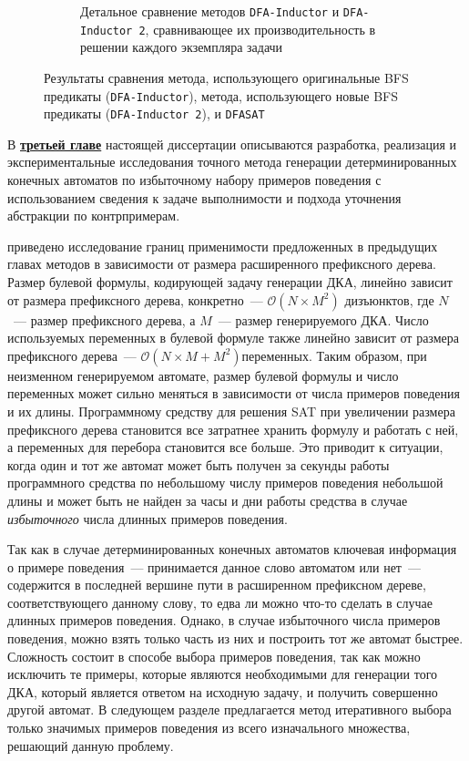 \begin{figure}[ht]
\begin{subfigure}[b]{0.48\textwidth}
    \caption{Детальное сравнение методов \texttt{DFA-Inductor} и \texttt{DFA-Inductor~2}, сравнивающее их производительность в решении каждого экземпляра задачи}
    \label{syn:img:plots:scatter}
  \end{subfigure}
  \caption{Результаты сравнения метода, использующего оригинальные BFS предикаты (\texttt{DFA-Inductor}), метода, использующего новые BFS предикаты (\texttt{DFA-Inductor~2}), и \texttt{DFASAT}}
  \label{syn:img:plots}
\end{figure}


В \textbf{\underline{третьей главе}} настоящей диссертации описываются разработка, реализация и экспериментальные исследования точного метода генерации детерминированных конечных автоматов по избыточному набору примеров поведения с использованием сведения к задаче выполнимости и подхода уточнения абстракции по контрпримерам.

\insection{\ref{sec:cegar:motivation}} приведено исследование границ применимости предложенных в предыдущих главах методов в зависимости от размера расширенного префиксного дерева. 
Размер булевой формулы, кодирующей задачу генерации ДКА, линейно зависит от размера префиксного дерева, конкретно~--- $\mathcal{O}\left(N \times M^{2}\right)$ дизъюнктов, где $N$~--- размер префиксного дерева, а $M$~--- размер генерируемого ДКА.
Число используемых переменных в булевой формуле также линейно зависит от размера префиксного дерева~--- $\mathcal{O}\left(N \times M + M^{2}\right) переменных.$
Таким образом, при неизменном генерируемом автомате, размер булевой формулы и число переменных может сильно меняться в зависимости от числа примеров поведения и их длины.
Программному средству для решения SAT при увеличении размера префиксного дерева становится все затратнее хранить формулу и работать с ней, а переменных для перебора становится все больше.
Это приводит к ситуации, когда один и тот же автомат может быть получен за секунды работы программного средства по небольшому числу примеров поведения небольшой длины и может быть не найден за часы и дни работы средства в случае \emph{избыточного} числа длинных примеров поведения.

Так как в случае детерминированных конечных автоматов ключевая информация о примере поведения~--- принимается данное слово автоматом или нет~--- содержится в последней вершине пути в расширенном префиксном дереве, соответствующего данному слову, то едва ли можно что-то сделать в случае длинных примеров поведения.
Однако, в случае избыточного числа примеров поведения, можно взять только часть из них и построить тот же автомат быстрее.
Сложность состоит в способе выбора примеров поведения, так как можно исключить те примеры, которые являются необходимыми для генерации того ДКА, который является ответом на исходную задачу, и получить совершенно другой автомат.
В следующем разделе предлагается метод итеративного выбора только значимых примеров поведения из всего изначального множества, решающий данную проблему.

